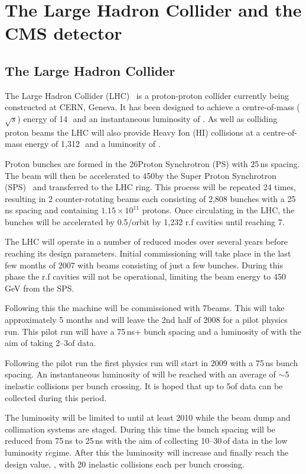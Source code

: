 \chapter{The Large Hadron Collider and the CMS detector\label{ch:cmsdetector}}

\section{The Large Hadron Collider}
The Large Hadron Collider (LHC)~\cite{LHC_CONCEPT} is a proton-proton collider currently being constructed at CERN, Geneva. It has been designed to achieve a centre-of-mass ($\sqrt{s}$) energy of 14\,~\TeV and an instantaneous luminosity of \hilumi. As well as colliding proton beams the LHC will also provide Heavy Ion (HI) collisions at a centre-of-mass energy of 1,312\,~\TeV and a luminosity of \hilumiHI.

Proton bunches are formed in the 26\GeV Proton Synchrotron (PS) with 25\,ns spacing. The beam will then be accelerated to 450\GeV by the Super Proton Synchrotron (SPS)~\cite{citeulike:821072} and transferred to the LHC ring. This process will be repeated 24 times, resulting in 2 counter-rotating beams each consisting of 2,808 bunches with a 25\,ns spacing and containing $1.15\times 10^{11}$ protons. Once circulating in the LHC, the bunches will be accelerated by 0.5\MeV/orbit by 1,232 r.f cavities until reaching 7\TeV.

The LHC will operate in a number of reduced modes over several years before reaching its design parameters. Initial commissioning will take place in the last few months of 2007 with beams consisting of just a few bunches. During this phase the r.f cavities will not be operational, limiting the beam energy to 450\,GeV from the SPS.

Following this the machine will be commissioned with 7\TeV beams. This will take approximately 5 months and will leave the 2nd half of 2008 for a pilot physics run. This pilot run will have a 75\,ns+ bunch spacing and a luminosity of \pilotlumi with the aim of taking 2--3\pbinv of data. 

Following the pilot run the first physics run will start in 2009 with a 75\,ns bunch spacing. An instantaneous luminosity of \lowlumi will be reached with an average of $\sim$5 inelastic collisions per bunch crossing. It is hoped that up to 5\fb of data can be collected during this period. 

The luminosity will be limited to \lowlumi until at least 2010 while the beam dump and collimation systems are staged. During this time the bunch spacing will be reduced from 75\,ns to 25\,ns with the aim of collecting 10--30\,\fb of data in the low luminosity r$\acute{e}$gime. After this the luminosity will increase and finally reach the design value, \hilumi, with 20 inelastic collisions each per bunch crossing.
%

